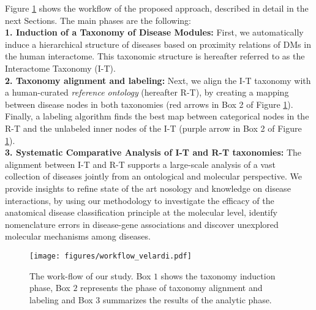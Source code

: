 \documentclass[journal,twoside,web]{ieeecolor}
\begin{document}
\noindent
Figure \ref{fig: workflow} shows the workflow of the proposed approach, described in detail in the next Sections. The main phases are the following: \\
\noindent    
{\bf 1. Induction of a Taxonomy of Disease Modules:} 
    First, we automatically induce a hierarchical structure of diseases based on proximity relations of DMs in the human interactome. This taxonomic structure is hereafter referred to as the Interactome Taxonomy (I-T).\\
     \noindent
{\bf 2. Taxonomy alignment and labeling:} Next, we align the I-T taxonomy with a human-curated  \textit{reference  ontology} (hereafter R-T), by creating a mapping between disease nodes in both taxonomies (red arrows in Box 2 of Figure \ref{fig: workflow}). Finally,  a labeling algorithm finds the best map between categorical nodes in the R-T  and the unlabeled inner nodes of the  I-T (purple arrow in Box 2 of Figure \ref{fig: workflow}). \\
   \noindent
    {\bf 3. Systematic Comparative Analysis of I-T and R-T taxonomies:} The alignment between  I-T and  R-T supports a large-scale analysis of a vast collection of diseases  jointly from an ontological and molecular perspective.  
    We provide insights to refine state of the art nosology and knowledge on  disease interactions, by using our methodology to investigate the efficacy of the anatomical disease classification principle at the molecular level, identify nomenclature errors in disease-gene associations and discover  unexplored molecular mechanisms among diseases.

\begin{figure}[ht!]
\centering
\texttt{[image: figures/workflow\_velardi.pdf]}
\caption{The work-flow of our study. Box $1$ shows the taxonomy induction phase, Box $2$ represents the phase of taxonomy  alignment and labeling and Box $3$ summarizes the results of the analytic phase.}
\label{fig: workflow}
\end{figure}   

\vspace{-15pt}
\end{document}
